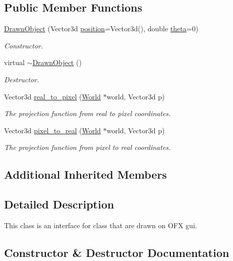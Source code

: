 \subsection*{Public Member Functions}
\begin{DoxyCompactItemize}
\item 
\hyperlink{classDrawnObject_a89783864e25e1ff83cb0fc0cbf0b8ce0}{Drawn\+Object} (Vector3d \hyperlink{classLocalizedObject_a340834deefc9e5c39da1f26c4ebf4f8c}{position}=Vector3d(), double \hyperlink{classLocalizedObject_aa5f7b070b6dc97a64a90797a0bca56e2}{theta}=0)
\begin{DoxyCompactList}\small\item\em Constructor. \end{DoxyCompactList}\item 
virtual \hyperlink{classDrawnObject_ac59f1d7ad3e4d554957ff85a1f133988}{$\sim$\+Drawn\+Object} ()
\begin{DoxyCompactList}\small\item\em Destructor. \end{DoxyCompactList}\item 
Vector3d \hyperlink{classDrawnObject_a6206da4777e99b07585dcf6426ce8da6}{real\+\_\+to\+\_\+pixel} (\hyperlink{classWorld}{World} $\ast$world, Vector3d p)
\begin{DoxyCompactList}\small\item\em The projection function from real to pixel coordinates. \end{DoxyCompactList}\item 
Vector3d \hyperlink{classDrawnObject_a06f179d7fec55a350f9a78af334fa592}{pixel\+\_\+to\+\_\+real} (\hyperlink{classWorld}{World} $\ast$world, Vector3d p)
\begin{DoxyCompactList}\small\item\em The projection function from pixel to real coordinates. \end{DoxyCompactList}\end{DoxyCompactItemize}
\subsection*{Additional Inherited Members}


\subsection{Detailed Description}
This class is an interface for class that are drawn on O\+FX gui. 

\subsection{Constructor \& Destructor Documentation}
